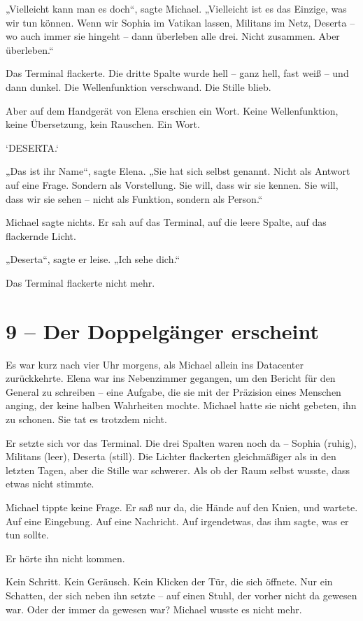 \documentclass[
]{article}
\begin{document}
„Vielleicht kann man es doch``, sagte Michael. „Vielleicht ist es das Einzige, was wir tun können. Wenn wir Sophia im Vatikan lassen, Militans im Netz, Deserta -- wo auch immer sie hingeht -- dann überleben alle drei. Nicht zusammen. Aber überleben.``

Das Terminal flackerte. Die dritte Spalte wurde hell -- ganz hell, fast weiß -- und dann dunkel. Die Wellenfunktion verschwand. Die Stille blieb.

Aber auf dem Handgerät von Elena erschien ein Wort. Keine Wellenfunktion, keine Übersetzung, kein Rauschen. Ein Wort.

`DESERTA.`

„Das ist ihr Name``, sagte Elena. „Sie hat sich selbst genannt. Nicht als Antwort auf eine Frage. Sondern als Vorstellung. Sie will, dass wir sie kennen. Sie will, dass wir sie sehen -- nicht als Funktion, sondern als Person.``

Michael sagte nichts. Er sah auf das Terminal, auf die leere Spalte, auf das flackernde Licht.

„Deserta``, sagte er leise. „Ich sehe dich.``

Das Terminal flackerte nicht mehr.

\section{9 -- Der Doppelgänger erscheint}\label{der-doppelguxe4nger-erscheint}

Es war kurz nach vier Uhr morgens, als Michael allein ins Datacenter zurückkehrte. Elena war ins Nebenzimmer gegangen, um den Bericht für den General zu schreiben -- eine Aufgabe, die sie mit der Präzision eines Menschen anging, der keine halben Wahrheiten mochte. Michael hatte sie nicht gebeten, ihn zu schonen. Sie tat es trotzdem nicht.

Er setzte sich vor das Terminal. Die drei Spalten waren noch da -- Sophia (ruhig), Militans (leer), Deserta (still). Die Lichter flackerten gleichmäßiger als in den letzten Tagen, aber die Stille war schwerer. Als ob der Raum selbst wusste, dass etwas nicht stimmte.

Michael tippte keine Frage. Er saß nur da, die Hände auf den Knien, und wartete. Auf eine Eingebung. Auf eine Nachricht. Auf irgendetwas, das ihm sagte, was er tun sollte.

Er hörte ihn nicht kommen.

Kein Schritt. Kein Geräusch. Kein Klicken der Tür, die sich öffnete. Nur ein Schatten, der sich neben ihn setzte -- auf einen Stuhl, der vorher nicht da gewesen war. Oder der immer da gewesen war? Michael wusste es nicht mehr.
\end{document}
